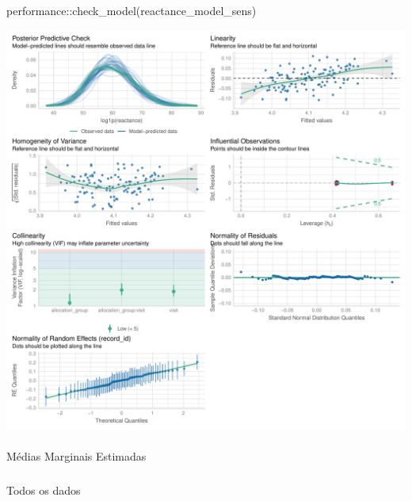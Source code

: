 \documentclass[
  12pt,
]{article}
\makeatletter
\let\oldparagraph\paragraph
\renewcommand{\paragraph}{
    \@ifstar
      \xxxParagraphStar
      \xxxParagraphNoStar
  }
\newcommand{\xxxParagraphStar}[1]{\oldparagraph*{#1}\mbox{}}
\newcommand{\xxxParagraphNoStar}[1]{\oldparagraph{#1}\mbox{}}
\let\oldsubparagraph\subparagraph
\renewcommand{\subparagraph}{
    \@ifstar
      \xxxSubParagraphStar
      \xxxSubParagraphNoStar
  }
\newcommand{\xxxSubParagraphStar}[1]{\oldsubparagraph*{#1}\mbox{}}
\newcommand{\xxxSubParagraphNoStar}[1]{\oldsubparagraph{#1}\mbox{}}
\newenvironment{Shaded}{\begin{snugshade}}{\end{snugshade}}
\newcommand{\FunctionTok}[1]{\textcolor[rgb]{0.28,0.35,0.67}{#1}}
\newcommand{\NormalTok}[1]{\textcolor[rgb]{0.00,0.23,0.31}{#1}}
\newcommand{\SpecialCharTok}[1]{\textcolor[rgb]{0.37,0.37,0.37}{#1}}
\makeatother
\begin{document}
\begin{Shaded}
\begin{Highlighting}[]
\NormalTok{performance}\SpecialCharTok{::}\FunctionTok{check\_model}\NormalTok{(reactance\_model\_sens)}
\end{Highlighting}
\end{Shaded}

\includegraphics{Outcomes_files/figure-pdf/reactance_4-2.pdf}

\paragraph{Médias Marginais
Estimadas}\label{muxe9dias-marginais-estimadas-18}

\subparagraph{Todos os dados}\label{todos-os-dados-18}
\end{document}
